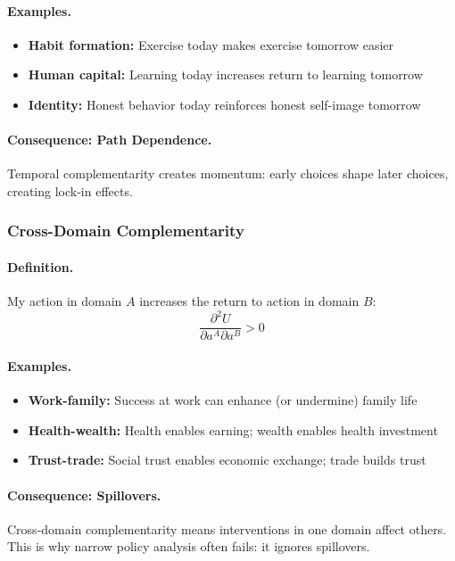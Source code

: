 \documentclass[12pt,a4paper]{article}
\begin{document}
\paragraph{Examples.}
\begin{itemize}
  \item \textbf{Habit formation:} Exercise today makes exercise tomorrow easier
  \item \textbf{Human capital:} Learning today increases return to learning tomorrow
  \item \textbf{Identity:} Honest behavior today reinforces honest self-image tomorrow
\end{itemize}

\paragraph{Consequence: Path Dependence.}
Temporal complementarity creates momentum:
early choices shape later choices, creating lock-in effects.

\subsubsection{Cross-Domain Complementarity}

\paragraph{Definition.}
My action in domain $A$ increases the return to action in domain $B$:
\begin{equation}
  \frac{\partial^2 U}{\partial a^A \partial a^B} > 0
\end{equation}

\paragraph{Examples.}
\begin{itemize}
  \item \textbf{Work-family:} Success at work can enhance (or undermine) family life
  \item \textbf{Health-wealth:} Health enables earning; wealth enables health investment
  \item \textbf{Trust-trade:} Social trust enables economic exchange; trade builds trust
\end{itemize}

\paragraph{Consequence: Spillovers.}
Cross-domain complementarity means interventions in one domain affect others.
This is why narrow policy analysis often fails: it ignores spillovers.
\end{document}
